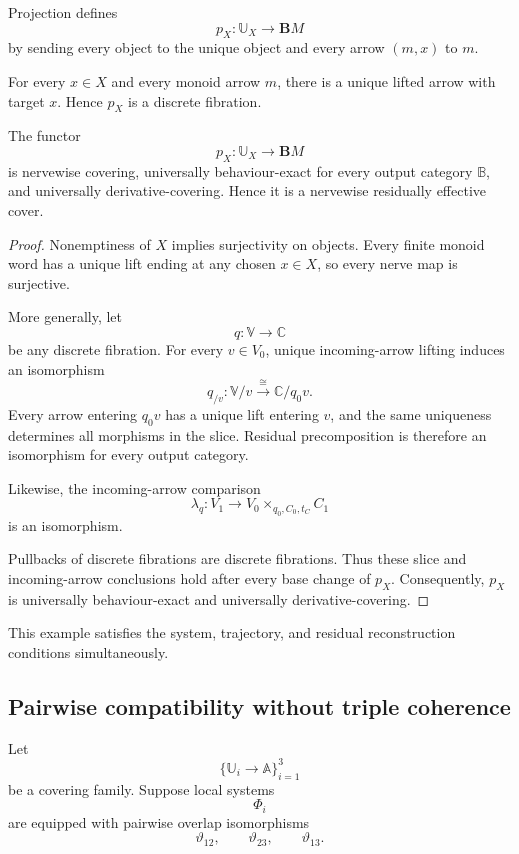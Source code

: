 Projection defines
\[
    p_X:\mathbb U_X\to\mathbf BM
\]
by sending every object to the unique object and every arrow
\((m,x)\) to \(m\).

For every \(x\in X\) and every monoid arrow \(m\), there is a unique lifted
arrow with target \(x\). Hence \(p_X\) is a discrete fibration.

\begin{proposition}
\label{prop:discrete-fibration-residual-cover}
The functor
\[
    p_X:\mathbb U_X\to\mathbf BM
\]
is nervewise covering, universally behaviour-exact for every output category
\(\mathbb B\), and universally derivative-covering. Hence it is a nervewise
residually effective cover.
\end{proposition}

\begin{proof}
Nonemptiness of \(X\) implies surjectivity on objects. Every finite monoid
word has a unique lift ending at any chosen \(x\in X\), so every nerve map is
surjective.

More generally, let
\[
    q:\mathbb V\to\mathbb C
\]
be any discrete fibration. For every \(v\in V_0\), unique incoming-arrow
lifting induces an isomorphism
\[
    q_{/v}:
    \mathbb V/v
    \xrightarrow{\cong}
    \mathbb C/q_0v.
\]
Every arrow entering \(q_0v\) has a unique lift entering \(v\), and the same
uniqueness determines all morphisms in the slice. Residual precomposition is
therefore an isomorphism for every output category.

Likewise, the incoming-arrow comparison
\[
    \lambda_q:
    V_1
    \to
    V_0\times_{q_0,C_0,t_C}C_1
\]
is an isomorphism.

Pullbacks of discrete fibrations are discrete fibrations. Thus these slice and
incoming-arrow conclusions hold after every base change of \(p_X\).
Consequently, \(p_X\) is universally behaviour-exact and universally
derivative-covering.
\end{proof}

This example satisfies the system, trajectory, and residual reconstruction
conditions simultaneously.

\subsection{Pairwise compatibility without triple coherence}
\label{subsec:example-pairwise-no-triple-coherence}

Let
\[
    \{\mathbb U_i\to\mathbb A\}_{i=1}^3
\]
be a covering family. Suppose local systems
\[
    \Phi_i
\]
are equipped with pairwise overlap isomorphisms
\[
    \vartheta_{12},
    \qquad
    \vartheta_{23},
    \qquad
    \vartheta_{13}.
\]

